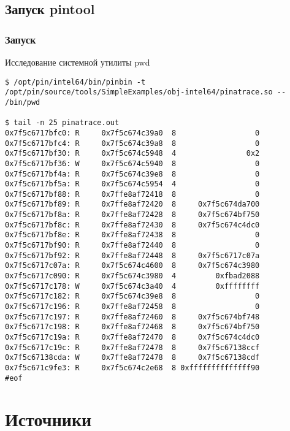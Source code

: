 \documentclass{beamer}
\begin{document}
\subsection{Запуск pintool}

\begin{frame}[fragile] %
\frametitle{Запуск}
\begin{block}{Исследование системной утилиты pwd}
\begin{verbatim}
$ /opt/pin/intel64/bin/pinbin -t /opt/pin/source/tools/SimpleExamples/obj-intel64/pinatrace.so -- /bin/pwd

$ tail -n 25 pinatrace.out 
0x7f5c6717bfc0: R     0x7f5c674c39a0  8                  0
0x7f5c6717bfc4: R     0x7f5c674c39a8  8                  0
0x7f5c6717bf30: R     0x7f5c674c5948  4                0x2
0x7f5c6717bf36: W     0x7f5c674c5940  8                  0
0x7f5c6717bf4a: R     0x7f5c674c39e8  8                  0
0x7f5c6717bf5a: R     0x7f5c674c5954  4                  0
0x7f5c6717bf88: R     0x7ffe8af72418  8                  0
0x7f5c6717bf89: R     0x7ffe8af72420  8     0x7f5c674da700
0x7f5c6717bf8a: R     0x7ffe8af72428  8     0x7f5c674bf750
0x7f5c6717bf8c: R     0x7ffe8af72430  8     0x7f5c674c4dc0
0x7f5c6717bf8e: R     0x7ffe8af72438  8                  0
0x7f5c6717bf90: R     0x7ffe8af72440  8                  0
0x7f5c6717bf92: R     0x7ffe8af72448  8     0x7f5c6717c07a
0x7f5c6717c07a: R     0x7f5c674c4600  8     0x7f5c674c3980
0x7f5c6717c090: R     0x7f5c674c3980  4         0xfbad2088
0x7f5c6717c178: W     0x7f5c674c3a40  4         0xffffffff
0x7f5c6717c182: R     0x7f5c674c39e8  8                  0
0x7f5c6717c196: R     0x7ffe8af72458  8                  0
0x7f5c6717c197: R     0x7ffe8af72460  8     0x7f5c674bf748
0x7f5c6717c198: R     0x7ffe8af72468  8     0x7f5c674bf750
0x7f5c6717c19a: R     0x7ffe8af72470  8     0x7f5c674c4dc0
0x7f5c6717c19c: R     0x7ffe8af72478  8     0x7f5c67138ccf
0x7f5c67138cda: W     0x7ffe8af72478  8     0x7f5c67138cdf
0x7f5c671c9fe3: R     0x7f5c674c2e68  8 0xffffffffffffff90
#eof
\end{verbatim}
\end{block}
\end{frame}

\section{Источники}
\end{document}
